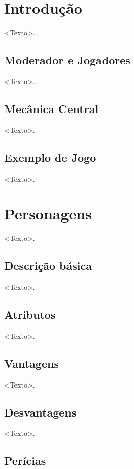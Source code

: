 \documentclass[a4paper, twocolumn, 10pt]{book}
\begin{document}
\tableofcontents

\chapter{Introdução}

<Texto>.

\section{Moderador e Jogadores}

<Texto>.

\section{Mecânica Central}

<Texto>.

\section{Exemplo de Jogo}

<Texto>.

\chapter{Personagens}

<Texto>.

\section{Descrição básica}

<Texto>.

\section{Atributos}

<Texto>.

\section{Vantagens}

<Texto>.

\section{Desvantagens}

<Texto>.

\section{Perícias}
\end{document}

